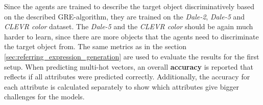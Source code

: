 Since the agents are trained to describe the target object discriminatively based on the described GRE-algorithm, they are trained on the \emph{Dale-2}, \emph{Dale-5} and \emph{CLEVR color} dataset.
The \emph{Dale-5} and the \emph{CLEVR color} should be again much harder to learn, since there are more objects that the agents need to discriminate the target object from.
The same metrics as in the section \ref{sec:referring_expression_generation} are used to evaluate the results for the first setup.
When predicting multi-hot vectors, an overall \textbf{accuracy} is reported that reflects if all attributes were predicted correctly.
Additionally, the accuracy for each attribute is calculated separately to show which attributes give bigger challenges for the models.

